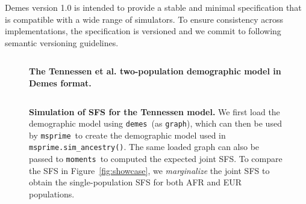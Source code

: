 \documentclass[11pt]{article}
\newcommand{\msprime}[0]{\texttt{msprime}}
\newcommand{\demes}[0]{\texttt{demes}}
\newcommand{\moments}[0]{\texttt{moments}}
\begin{document}
Demes version 1.0 is intended to provide a stable and minimal specification
that is compatible with a wide range of simulators. To ensure consistency
across implementations, the specification is versioned and we commit to
following semantic versioning guidelines.



\begin{figure}[h!]
    \begin{tcolorbox}
        \inputminted[fontsize=\scriptsize,linenos,numbersep=5pt]{yaml}{models/tennessen.yml}
    \end{tcolorbox}
    \caption{
        \textbf{The Tennessen et al. two-population demographic model in Demes format.}
    }
    \label{fig:tennessen}
\end{figure}

\begin{figure}[h!]
    \begin{tcolorbox}
        \inputminted[fontsize=\scriptsize,linenos,numbersep=5pt]{python}{models/tennessen-simulation.py}
    \end{tcolorbox}
    \caption{
        \textbf{Simulation of SFS for the Tennessen model.}
        We first load the demographic model using \demes\ (as \texttt{graph}),
        which can then be used by \msprime\ to create the demographic model used in
        \texttt{msprime.sim\_ancestry()}. The same loaded graph can also be
        passed to \moments\ to computed the expected joint SFS.
        To compare the SFS in Figure~\ref{fig:showcase}, we \emph{marginalize} the
        joint SFS to obtain the single-population SFS for both AFR and EUR populations.
    }
    \label{fig:tennessen-simulation}
\end{figure}
\end{document}
